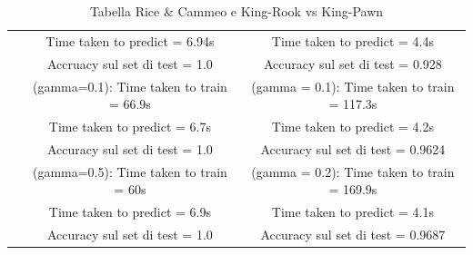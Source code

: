 \documentclass{article}
\begin{document}
\begin{table}[htbp]
\begin{tabular}{|c|c|c|}
	  & Time taken to predict = 6.94s & Time taken to predict = 4.4s\\
	  & Accruacy sul set di test = 1.0 & Accuracy sul set di test = 0.928\\
	  & (gamma=0.1): Time taken to train = 66.9s & (gamma = 0.1): Time taken to train = 117.3s\\
	  & Time taken to predict = 6.7s & Time taken to predict = 4.2s\\
	  & Accuracy sul set di test = 1.0 & Accuracy sul set di test = 0.9624\\
	  & (gamma=0.5): Time taken to train = 60s & (gamma = 0.2): Time taken to train = 169.9s\\
	  & Time taken to predict = 6.9s & Time taken to predict = 4.1s\\
	  & Accuracy sul set di test = 1.0 & Accuracy sul set di test = 0.9687\\
	  \hline
	\end{tabular}
	\caption{Tabella Rice \& Cammeo e King-Rook vs King-Pawn}
  \end{table}
\end{document}
